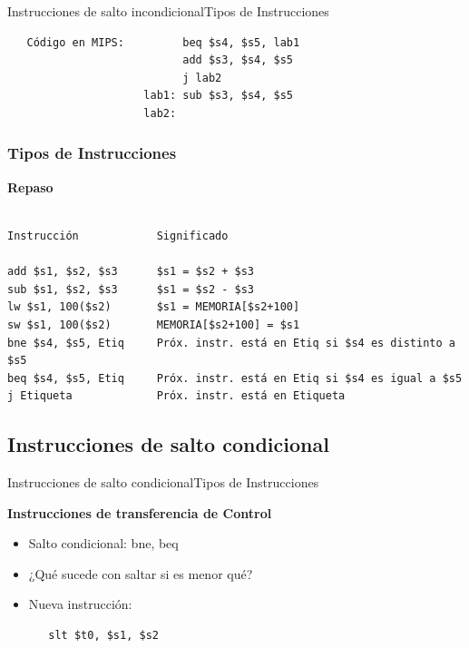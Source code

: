 \documentclass[aspectratio=169,compress]{beamer}
\begin{document}
\begin{footnotesize}
\begin{frame}[fragile]{Instrucciones de salto incondicional}{Tipos de Instrucciones}
\begin{itemize}
\begin{verbatim}
   Código en MIPS:         beq $s4, $s5, lab1
                           add $s3, $s4, $s5
                           j lab2
                     lab1: sub $s3, $s4, $s5
                     lab2:
\end{verbatim}
\end{itemize}
\end{frame}




\begin{frame}[fragile]
\frametitle{Tipos de Instrucciones}
\begin{center}\textbf{Repaso}\end{center}

\footnotesize
\begin{verbatim}

Instrucción            Significado

add $s1, $s2, $s3      $s1 = $s2 + $s3
sub $s1, $s2, $s3      $s1 = $s2 - $s3
lw $s1, 100($s2)       $s1 = MEMORIA[$s2+100]
sw $s1, 100($s2)       MEMORIA[$s2+100] = $s1
bne $s4, $s5, Etiq     Próx. instr. está en Etiq si $s4 es distinto a $s5
beq $s4, $s5, Etiq     Próx. instr. está en Etiq si $s4 es igual a $s5
j Etiqueta             Próx. instr. está en Etiqueta

\end{verbatim}
\end{frame}

\subsection{Instrucciones de salto condicional}

\begin{frame}[fragile]{Instrucciones de salto condicional}{Tipos de Instrucciones}
\begin{center}\textbf{Instrucciones de transferencia de Control}\end{center}

\begin{itemize}
\item Salto condicional: bne, beq
\item ¿Qué sucede con saltar si es menor qué?
\item Nueva instrucción:
\begin{verbatim}
   slt $t0, $s1, $s2


\end{verbatim}
\end{itemize}
\end{frame}
\end{footnotesize}
\end{document}
